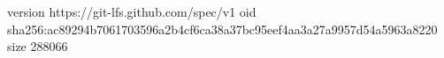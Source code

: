 version https://git-lfs.github.com/spec/v1
oid sha256:ac89294b7061703596a2b4cf6ca38a37bc95eef4aa3a27a9957d54a5963a8220
size 288066
